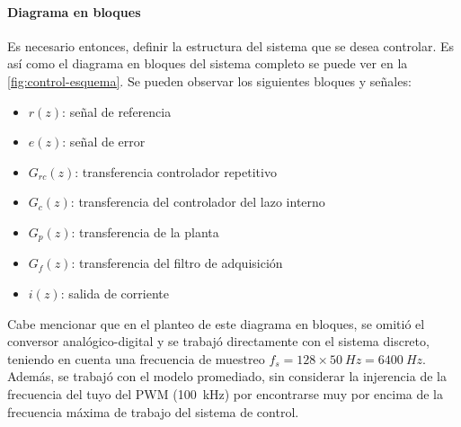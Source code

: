 \documentclass[titlepage, 12pt]{article}
\begin{document}
\paragraph{Diagrama en bloques}
Es necesario entonces, definir la estructura del sistema que se desea controlar. Es así como el diagrama en bloques del sistema completo se puede ver en la \autoref{fig:control-esquema}. Se pueden observar los siguientes bloques y señales:
    \begin{itemize}
        \item $r(z)$: señal de referencia
        \item $e(z)$: señal de error
        \item $G_{rc}(z)$: transferencia controlador repetitivo
        \item $G_c(z)$: transferencia del controlador del lazo interno
        \item $G_p(z)$: transferencia de la planta
        \item $G_f(z)$: transferencia del filtro de adquisición
        \item $i(z)$: salida de corriente
    \end{itemize}

Cabe mencionar que en el planteo de este diagrama en bloques, se omitió el conversor analógico-digital y se trabajó directamente con el sistema discreto, teniendo en cuenta una frecuencia de muestreo $f_s = 128 \times \SI{50}{Hz} = \SI{6400}{Hz}$. Además, se trabajó con el modelo promediado, sin considerar la injerencia de la frecuencia del tuyo del PWM (\SI{100}{kHz}) por encontrarse muy por encima de la frecuencia máxima de trabajo del sistema de control.
\end{document}
